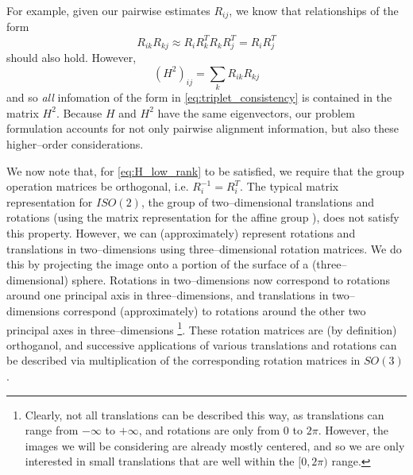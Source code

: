 \documentclass[11pt]{article}
\begin{document}
%
For example, given our pairwise estimates $R_{ij}$, we know that relationships of the form
\begin{equation} \label{eq:triplet_consistency}
R_{ik} R_{kj} \approx R_i R_k^T R_k R_j^T = R_i R_j^T
\end{equation}
should also hold.
%
However, 
\begin{equation}
(H^2)_{ij} = \sum_k R_{ik} R_{kj}
\end{equation}
and so {\em all} infomation of the form in \eqref{eq:triplet_consistency} is contained in the matrix $H^2$.
%
Because $H$ and $H^2$ have the same eigenvectors, our problem formulation accounts for not only pairwise alignment information, but also these higher--order considerations. 

We now note that, for \eqref{eq:H_low_rank} to be satisfied, we require that the group operation matrices be orthogonal, i.e. $R_i^{-1} = R_i^T$. 
%
The typical matrix representation for $ISO(2)$, the group of two--dimensional translations and rotations (using the matrix representation for the affine group \cite{...}), does not satisfy this property. 
%
However, we can (approximately) represent rotations and translations in two--dimensions using three--dimensional rotation matrices.
%
We do this by projecting the image onto a portion of the surface of a (three--dimensional) sphere.
%
Rotations in two--dimensions now correspond to rotations around one principal axis in three--dimensions, and translations in two--dimensions correspond (approximately) to rotations around the other two principal axes in three--dimensions \footnote{Clearly, not all translations can be described this way, as translations can range from $-\infty$ to $+ \infty$, and rotations are only from $0$ to $2 \pi$. However, the images we will be considering are already mostly centered, and so we are only interested in small translations that are well within the $[0, 2\pi)$ range.}.
%
These rotation matrices are (by definition) orthoganol, and successive applications of various translations and rotations can be described via multiplication of the corresponding rotation matrices in $SO(3)$.
\end{document}
